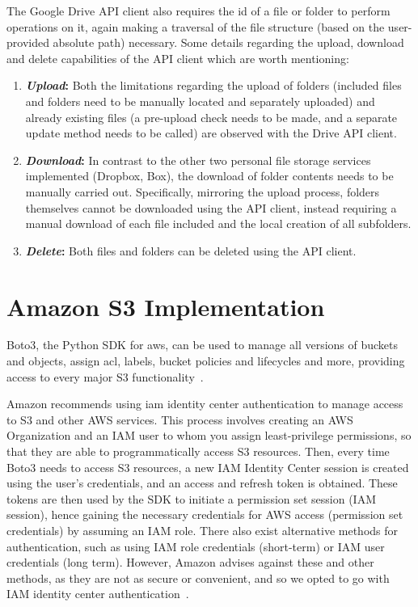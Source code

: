 The Google Drive API client also requires the id of a file or folder to perform operations on it, again making a traversal of the file structure (based on the user-provided absolute path) necessary. Some details regarding the upload, download and delete capabilities of the API client which are worth mentioning: ~\cite{drive_docs}

\begin{enumerate}
    \item \textbf{\textit{Upload}:} Both the limitations regarding the upload of folders  (included files and folders need to be manually located and separately uploaded) and already existing files (a pre-upload check needs to be made, and a separate update method needs to be called) are observed with the Drive API client.

    \item \textbf{\textit{Download}:} In contrast to the other two personal file storage services implemented (Dropbox, Box), the download of folder contents needs to be manually carried out. Specifically, mirroring the upload process, folders themselves cannot be downloaded using the API client, instead requiring a manual download of each file included and the local creation of all subfolders.

    \item \textbf{\textit{Delete}:} Both files and folders can be deleted using the API client.
\end{enumerate}


\section{Amazon S3 Implementation}
Boto3, the Python SDK for \ac{aws},  can be used to manage all versions of buckets and objects, assign \ac{acl}, labels, bucket policies and lifecycles and more, providing access to every major S3 functionality~\cite{s3_docs}.

Amazon recommends using \ac{iam} identity center authentication to manage access to S3 and other AWS services. This process involves creating an AWS Organization and an IAM user to whom you assign least-privilege permissions, so that they are able to programmatically access S3 resources. Then, every time Boto3 needs to access S3 resources, a new IAM Identity Center session is created using the user's credentials, and an access and refresh token is obtained. These tokens are then used by the SDK to initiate a permission set session (IAM session), hence gaining the necessary credentials for AWS access (permission set credentials) by assuming an IAM role. There also exist alternative methods for authentication, such as using IAM role credentials (short-term) or IAM user credentials (long term). However, Amazon advises against these and other methods, as they are not as secure or convenient, and so we opted to go with IAM identity center authentication~\cite{s3_auth}.

